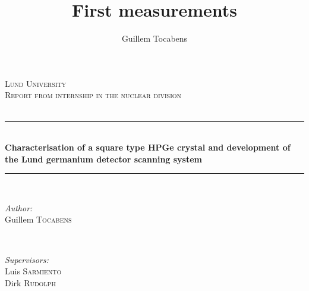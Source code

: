 \documentclass[11pt,a4paper]{article}
\author{Guillem Tocabens}
\title{First measurements}
\begin{document}
\begin{titlepage}

\newcommand{\HRule}{\rule{\linewidth}{0.5mm}} %

\center %
 

\textsc{\LARGE Lund University}\\[1.5cm] %
\textsc{\Large Report from internship in the nuclear division}\\[0.5cm] %
\textsc{\large }\\[0.5cm] %


\HRule \\[0.4cm]
{ \huge \bfseries Characterisation of a square type HPGe crystal and development of the Lund germanium detector scanning system}\\[0.4cm] %
\HRule \\[1.5cm]
 

\begin{minipage}{0.4\textwidth}
\begin{flushleft} \large
\emph{Author:}\\
Guillem \textsc{Tocabens}\\ %
\end{flushleft}
\end{minipage}
~
\begin{minipage}{0.4\textwidth}
\begin{flushright} \large
\emph{Supervisors:} \\
Luis \textsc{Sarmiento} \\
Dirk \textsc{Rudolph} %
\end{flushright}
\end{minipage}\\[2cm]


\end{titlepage}
\end{document}
